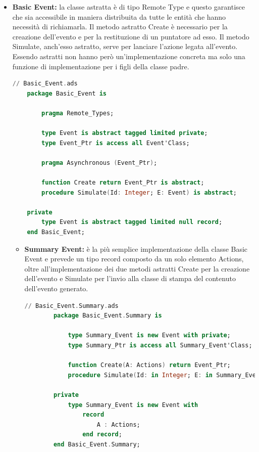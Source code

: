 \documentclass[aps,letterpaper,10pt]{article}
\begin{document}
\begin{itemize}
	\item \textbf{Basic Event:} la classe astratta \`e di tipo Remote Type e questo garantisce che sia accessibile in maniera distribuita da tutte le entit\`a che hanno necessit\`a di richiamarla. Il metodo astratto Create \`e necessario per la creazione dell'evento e per la restituzione di un puntatore ad esso. Il metodo Simulate, anch'esso astratto, serve per lanciare l'azione legata all'evento. Essendo astratti non hanno per\`o un'implementazione concreta ma solo una funzione di implementazione per i figli della classe padre.
	
	\begin{lstlisting}[language=Ada]
	// Basic_Event.ads
	package Basic_Event is
    
		pragma Remote_Types;
		
		type Event is abstract tagged limited private;
		type Event_Ptr is access all Event'Class;

		pragma Asynchronous (Event_Ptr);

		function Create return Event_Ptr is abstract;
	    procedure Simulate(Id: Integer; E: Event) is abstract;
	
	private
	    type Event is abstract tagged limited null record;
	end Basic_Event;
	\end{lstlisting}
	
	\begin{itemize}
		\item \textbf{Summary Event:} \`e la pi\`u semplice implementazione della classe Basic Event e prevede un tipo record composto da un solo elemento Actions, oltre all'implementazione dei due metodi astratti Create per la creazione dell'evento e Simulate per l'invio alla classe di stampa del contenuto dell'evento generato.
		
		\begin{lstlisting}[language=Ada]
		// Basic_Event.Summary.ads
		package Basic_Event.Summary is
    
			type Summary_Event is new Event with private; 
		    type Summary_Ptr is access all Summary_Event'Class;
	
		    function Create(A: Actions) return Event_Ptr; 
		    procedure Simulate(Id: in Integer; E: in Summary_Event);
		
		private
		    type Summary_Event is new Event with
		        record 
			        A : Actions;
		        end record;
		end Basic_Event.Summary;
		\end{lstlisting}
		

\end{itemize}
\end{itemize}
\end{document}
